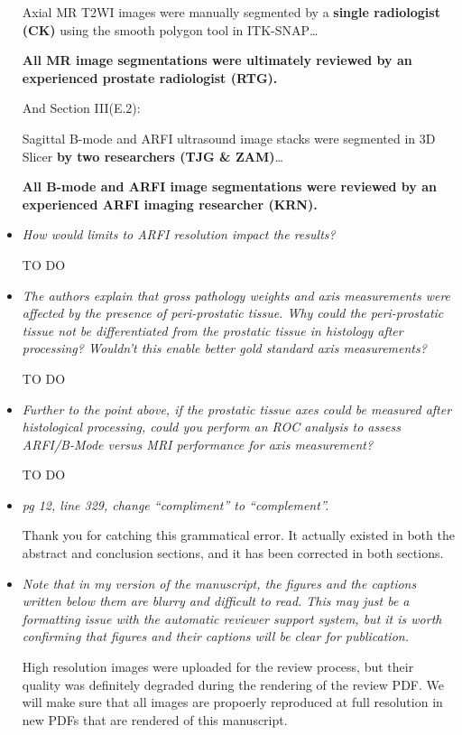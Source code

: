 \documentclass[10pt]{article}
\begin{document}
\begin{itemize}
    Axial MR T2WI images were manually segmented by a \textbf{single
        radiologist (CK)} using the smooth polygon tool in ITK-SNAP\ldots

    \textbf{All MR image segmentations were ultimately reviewed by an
        experienced prostate radiologist (RTG).}

    And Section III(E.2):

    Sagittal B-mode and ARFI ultrasound image stacks were segmented in 3D
    Slicer \textbf{by two researchers (TJG \& ZAM)}\ldots

    \textbf{All B-mode and ARFI image segmentations were reviewed by an
        experienced ARFI imaging researcher (KRN).}


    \item \textit{How would limits to ARFI resolution impact the results?}

    TO DO

    \item \textit{The authors explain that gross pathology weights and axis
            measurements were affected by the presence of peri-prostatic
            tissue.  Why could the peri-prostatic tissue not be differentiated
            from the prostatic tissue in histology after processing?  Wouldn't
            this enable better gold standard axis measurements?}

    TO DO

    \item \textit{Further to the point above, if the prostatic tissue axes
            could be measured after histological processing, could you perform
            an ROC analysis to assess ARFI/B-Mode versus MRI performance for
            axis measurement?}

    TO DO

    \item \textit{pg 12, line 329, change ``compliment'' to ``complement''.}

    Thank you for catching this grammatical error.  It actually existed in both
    the abstract and conclusion sections, and it has been corrected in both
    sections.

    \item \textit{Note that in my version of the manuscript, the figures and
            the captions written below them are blurry and difficult to read.
            This may just be a formatting issue with the automatic reviewer
            support system, but it is worth confirming that figures and their
            captions will be clear for publication.}

    High resolution images were uploaded for the review process, but their
    quality was definitely degraded during the rendering of the review PDF.  We
    will make sure that all images are propoerly reproduced at full resolution
    in new PDFs that are rendered of this manuscript.

\end{itemize}
\end{document}
